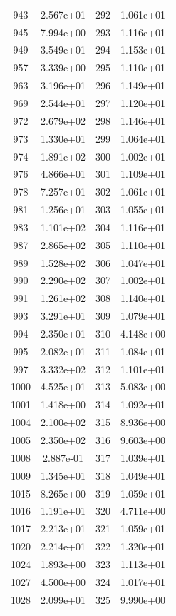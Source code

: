 \documentclass[12pt]{article}
\begin{document}
\begin{longtable}{@{}cccc@{}}
943 & 2.567e+01 & 292 & 1.061e+01 \\
945 & 7.994e+00 & 293 & 1.116e+01 \\
949 & 3.549e+01 & 294 & 1.153e+01 \\
957 & 3.339e+00 & 295 & 1.110e+01 \\
963 & 3.196e+01 & 296 & 1.149e+01 \\
969 & 2.544e+01 & 297 & 1.120e+01 \\
972 & 2.679e+02 & 298 & 1.146e+01 \\
973 & 1.330e+01 & 299 & 1.064e+01 \\
974 & 1.891e+02 & 300 & 1.002e+01 \\
976 & 4.866e+01 & 301 & 1.109e+01 \\
978 & 7.257e+01 & 302 & 1.061e+01 \\
981 & 1.256e+01 & 303 & 1.055e+01 \\
983 & 1.101e+02 & 304 & 1.116e+01 \\
987 & 2.865e+02 & 305 & 1.110e+01 \\
989 & 1.528e+02 & 306 & 1.047e+01 \\
990 & 2.290e+02 & 307 & 1.002e+01 \\
991 & 1.261e+02 & 308 & 1.140e+01 \\
993 & 3.291e+01 & 309 & 1.079e+01 \\
994 & 2.350e+01 & 310 & 4.148e+00 \\
995 & 2.082e+01 & 311 & 1.084e+01 \\
997 & 3.332e+02 & 312 & 1.101e+01 \\
1000 & 4.525e+01 & 313 & 5.083e+00 \\
1001 & 1.418e+00 & 314 & 1.092e+01 \\
1004 & 2.100e+02 & 315 & 8.936e+00 \\
1005 & 2.350e+02 & 316 & 9.603e+00 \\
1008 & 2.887e-01 & 317 & 1.039e+01 \\
1009 & 1.345e+01 & 318 & 1.049e+01 \\
1015 & 8.265e+00 & 319 & 1.059e+01 \\
1016 & 1.191e+01 & 320 & 4.711e+00 \\
1017 & 2.213e+01 & 321 & 1.059e+01 \\
1020 & 2.214e+01 & 322 & 1.320e+01 \\
1024 & 1.893e+00 & 323 & 1.113e+01 \\
1027 & 4.500e+00 & 324 & 1.017e+01 \\
1028 & 2.099e+01 & 325 & 9.990e+00 \\

\end{longtable}
\end{document}
